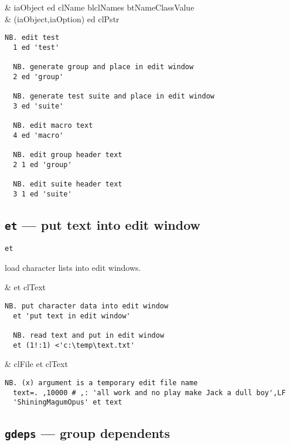 \begin{wordhead}
\dyad & iaObject ed clName \argsep blclNames \argsep btNameClassValue \\
      & (iaObject,iaOption) ed clPstr \\
\end{wordhead}
\begin{lstlisting}[frame=single,framerule=0pt]      
  NB. edit test
  1 ed 'test'
  
  NB. generate group and place in edit window    
  2 ed 'group'  
   
  NB. generate test suite and place in edit window
  3 ed 'suite'  
  
  NB. edit macro text 
  4 ed 'macro'  
   
  NB. edit group header text
  2 1 ed 'group' 
  
  NB. edit suite header text
  3 1 ed 'suite'  
\end{lstlisting}

\subsection{\texttt{et} --- put text into edit window}\label{ss:et} 

\hypertarget{il:et}{\texttt{et}} load character lists into edit windows.

\begin{wordhead}
\monad & et clText \\
\end{wordhead}
\begin{lstlisting}[frame=single,framerule=0pt]
  NB. put character data into edit window
  et 'put text in edit window' 

  NB. read text and put in edit window
  et (1!:1) <'c:\temp\text.txt' 
\end{lstlisting}

\begin{wordhead}
\dyad & clFile et clText \\
\end{wordhead}

\begin{lstlisting}[frame=single,framerule=0pt]
  NB. (x) argument is a temporary edit file name
  text=. ,10000 # ,: 'all work and no play make Jack a dull boy',LF
  'ShiningMagumOpus' et text
\end{lstlisting}

\subsection{\texttt{gdeps} --- group dependents}\label{ss:gdeps}

